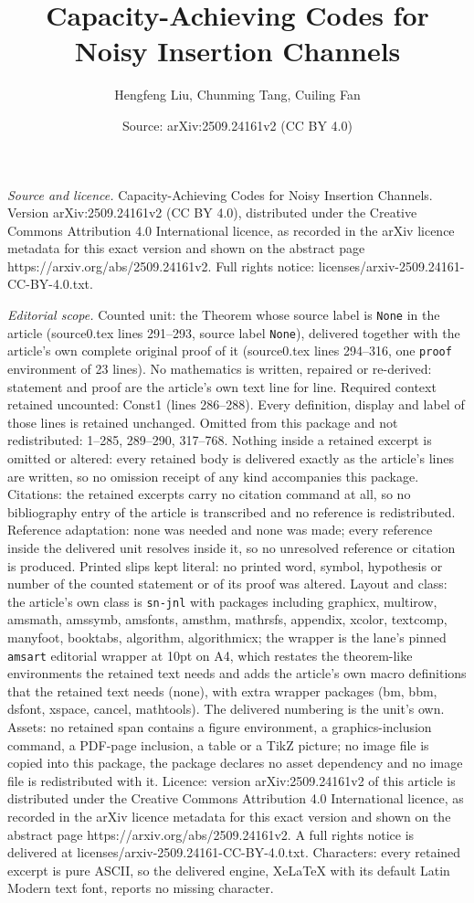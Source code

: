 \documentclass[10pt,a4paper]{amsart}
\title[Capacity-Achieving Codes for Noisy Insertion Channels]{Capacity-Achieving Codes for Noisy Insertion Channels}
\author{Hengfeng Liu, Chunming Tang, Cuiling Fan}
\date{Source: arXiv:2509.24161v2 (CC BY 4.0)}
\begin{document}
\maketitle

\noindent\emph{Source and licence.} Capacity-Achieving Codes for Noisy Insertion Channels. Version arXiv:2509.24161v2 (CC BY 4.0), distributed under the Creative Commons Attribution 4.0 International licence, as recorded in the arXiv licence metadata for this exact version and shown on the abstract page https://arxiv.org/abs/2509.24161v2. Full rights notice: licenses/arxiv-2509.24161-CC-BY-4.0.txt.\par\smallskip

\noindent\textit{Editorial scope.} Counted unit: the Theorem whose source label is \texttt{None} in the article (source0.tex lines 291--293, source label \texttt{None}), delivered together with the article's own complete original proof of it (source0.tex lines 294--316, one \texttt{proof} environment of 23 lines). No mathematics is written, repaired or re-derived: statement and proof are the article's own text line for line. Required context retained uncounted: Const1 (lines 286--288). Every definition, display and label of those lines is retained unchanged. Omitted from this package and not redistributed: 1--285, 289--290, 317--768. Nothing inside a retained excerpt is omitted or altered: every retained body is delivered exactly as the article's lines are written, so no omission receipt of any kind accompanies this package. Citations: the retained excerpts carry no citation command at all, so no bibliography entry of the article is transcribed and no reference is redistributed. Reference adaptation: none was needed and none was made; every reference inside the delivered unit resolves inside it, so no unresolved reference or citation is produced. Printed slips kept literal: no printed word, symbol, hypothesis or number of the counted statement or of its proof was altered. Layout and class: the article's own class is \texttt{sn-jnl} with packages including graphicx, multirow, amsmath, amssymb, amsfonts, amsthm, mathrsfs, appendix, xcolor, textcomp, manyfoot, booktabs, algorithm, algorithmicx; the wrapper is the lane's pinned \texttt{amsart} editorial wrapper at 10pt on A4, which restates the theorem-like environments the retained text needs and adds the article's own macro definitions that the retained text needs (none), with extra wrapper packages (bm, bbm, dsfont, xspace, cancel, mathtools). The delivered numbering is the unit's own. Assets: no retained span contains a figure environment, a graphics-inclusion command, a PDF-page inclusion, a table or a TikZ picture; no image file is copied into this package, the package declares no asset dependency and no image file is redistributed with it. Licence: version arXiv:2509.24161v2 of this article is distributed under the Creative Commons Attribution 4.0 International licence, as recorded in the arXiv licence metadata for this exact version and shown on the abstract page https://arxiv.org/abs/2509.24161v2. A full rights notice is delivered at licenses/arxiv-2509.24161-CC-BY-4.0.txt. Characters: every retained excerpt is pure ASCII, so the delivered engine, XeLaTeX with its default Latin Modern text font, reports no missing character.
\end{document}
